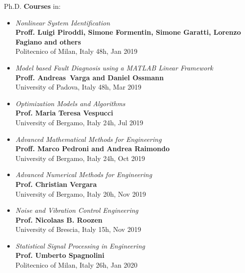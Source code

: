 \documentclass[10pt]{article}
\begin{document}
Ph.D. \textbf{Courses} in:
\begin{itemize}	
	\setlength\itemsep{-3pt}
	\renewcommand\labelitemi{$\vcenter{\hbox{\tiny$\bullet$}}$}
	\item \textit{Nonlinear System Identification}\\
	\textbf{Proff. Luigi Piroddi, Simone Formentin, Simone Garatti, Lorenzo Fagiano and others}\\
	Politecnico of Milan, Italy \hfill 48h, Jan 2019\\
	\item \textit{Model based Fault Diagnosis using a MATLAB Linear Framework}\\
	\textbf{Proff. Andreas Varga and Daniel Ossmann}\\
	University of Padova, Italy \hfill 48h, Mar 2019\\
	\item \textit{Optimization Models and Algorithms}\\
	\textbf{Prof. Maria Teresa Vespucci}\\
	University of Bergamo, Italy \hfill 24h, Jul 2019\\
	\item \textit{Advanced Mathematical Methods for Engineering}\\
	\textbf{Proff. Marco Pedroni and Andrea Raimondo}\\
	University of Bergamo, Italy \hfill 24h, Oct 2019\\
	\item \textit{Advanced Numerical Methods for Engineering}\\
	\textbf{Prof. Christian Vergara}\\
	University of Bergamo, Italy \hfill 20h, Nov 2019\\
	\item \textit{Noise and Vibration Control Engineering}\\
	\textbf{Prof. Nicolaas B. Roozen}\\
	University of Brescia, Italy \hfill 15h, Nov 2019\\
	\item \textit{Statistical Signal Processing in Engineering}\\
	\textbf{Prof. Umberto Spagnolini}\\
	Politecnico of Milan, Italy \hfill 26h, Jan 2020\\
	
\end{itemize}
\end{document}
